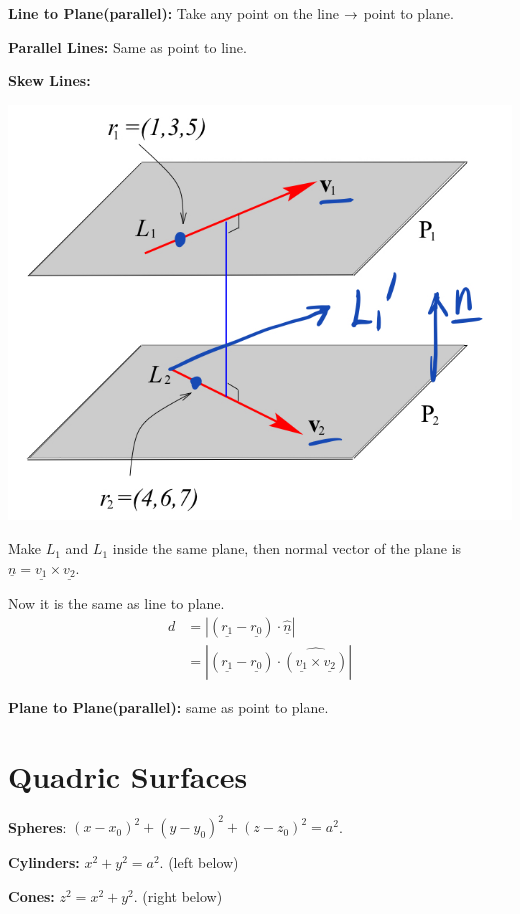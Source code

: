\documentclass[11pt, a4paper]{MATH2023}
\newcommand{\vct}{\underline}
\begin{document}
\begin{spacing}{1.3}
    {\bf Line to Plane(parallel): } Take any point on the line $\rightarrow$ point to plane.

    {\bf Parallel Lines: } Same as point to line.

    {\bf Skew Lines:} 

    \begin{center}
        \includegraphics[scale=0.3]{images/Ch10-dist-line-line.jpeg}
    \end{center}

    Make $L_1$ and $L_1$ inside the same plane, then normal vector of 
    the plane is $\vct{n}=\vct{v_1}\times \vct{v_2}$.

    Now it is the same as line to plane.
    \begin{align*}
        d &= | (\vct{r_1}-\vct{r_0})\cdot \hat{\vct{n}} |\\
         &= | (\vct{r_1}-\vct{r_0})\cdot \widehat{(\vct{v_1}\times \vct{v_2})} |
    \end{align*}

    
    {\bf Plane to Plane(parallel):} same as point to plane. 


    \section{Quadric Surfaces}


    {\bf Spheres}: $(x-x_0)^2+(y-y_0)^2+(z-z_0)^2=a^2$.

    {\bf Cylinders:} $x^2+y^2=a^2$. (left below)

    {\bf Cones:} $z^2=x^2+y^2$. (right below)
    

\end{spacing}
\end{document}
